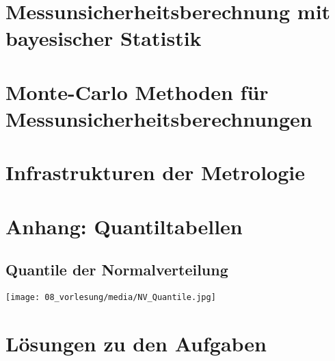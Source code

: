 \documentclass[a4paper,11pt]{book}
\begin{document}
\chapter{Messunsicherheitsberechnung mit bayesischer Statistik}
\label{bayesMU}


\chapter{Monte-Carlo Methoden für Messunsicherheitsberechnungen}
\label{montecarloMU}


\chapter{Infrastrukturen der Metrologie}


\chapter{Anhang: Quantiltabellen}
\label{quantiltabellen}
\section{Quantile der Normalverteilung}
\begin{center}
 \texttt{[image: 08\_vorlesung/media/NV\_Quantile.jpg]}
\end{center}


\chapter{Lösungen zu den Aufgaben}



\end{document}
